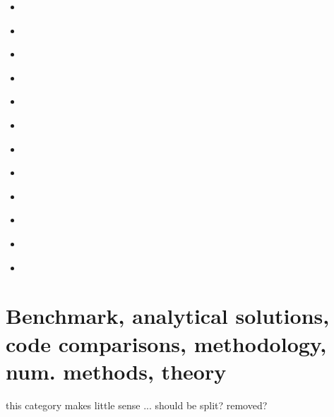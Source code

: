 \begin{scriptsize}
\begin{itemize}
\item[\nineteeneightytwo] 
\textcite{crpi82} 
\item[\nineteeneightynine] 
\textcite{ribe89} 
\item[\nineteenninetythree]
\textcite{shem93} 
\item[\twothousandtwo] 
\textcite{hube02b} 
\item[\twothousandfive] 
\textcite{lahb05} 
\item[\twothousandsix] 
\textcite{basv06} \\ 
\textcite{cuhy06} 
\item[\twothousandten] 
\textcite{habl10} 
\item[\twothousandthirteen] 
\textcite{namu13} \\ 
\textcite{gogu14}
\item[\twothousandseventeen] 
\textcite{babm17} 
\item[\twothousandnineteen] 
\textcite{magn19} 
\item[\twothousandtwentyone] 
\textcite{scvg21} \\
\textcite{erhf21} 
\item[\twothousandtwentytwo] 
\textcite{scva22} \\ 
\textcite{shlz22} 
\end{itemize}
\end{scriptsize}


\section{Benchmark, analytical solutions, code comparisons, methodology, num. methods, theory}

{\color{red} this category makes little sense ... should be split? removed? }

